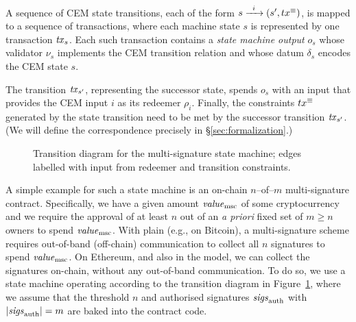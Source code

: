 A sequence of CEM state transitions, each of the form $ s \xrightarrow{\hspace{5pt} i \hspace{5pt}} (s' , tx^\equiv) $, is mapped to a sequence of transactions, where each machine state $s$ is represented by one transaction $\mathit{tx}_s$. Each such transaction contains a \emph{state machine output} $o_s$ whose validator $\nu_s$ implements the CEM transition relation and whose datum $\delta_s$ encodes the CEM state $s$.

The transition $\mathit{tx}_{s'}$, representing the successor state, spends $o_s$ with an input that provides the CEM input $i$ as its redeemer $\rho_i$. Finally, the constraints $tx^\equiv$ generated by the state transition need to be met by the successor transition $\mathit{tx}_{s'}$. (We will define the correspondence precisely in \S\ref{sec:formalization}.)

\begin{figure}[t]
  \centering
  \caption{Transition diagram for the multi-signature state machine;
    edges labelled with input from redeemer and transition constraints.}
  \label{fig:multisig-machine}
\end{figure}

A simple example for such a state machine is an on-chain $n$--of--$m$ multi-signature contract. Specifically, we have a given amount
$\mathit{value}_{\mathrm{msc}}$ of some cryptocurrency and we require the approval of at
least $n$ out of an \textit{a priori} fixed set of $m \geq n$ owners to spend
$\mathit{value}_{\mathrm{msc}}$. With plain \UTXO{} (e.g., on Bitcoin), a multi-signature
scheme requires out-of-band (off-chain) communication to collect all
$n$ signatures to spend $\mathit{value}_{\mathrm{msc}}$. On Ethereum, and also in the
\EUTXO{} model, we can collect the signatures on-chain, without any
out-of-band communication. To do so, we use a state machine operating
according to the transition diagram in
Figure~\ref{fig:multisig-machine}, where we assume that the threshold
$n$ and authorised signatures $\mathit{sigs}_{\mathrm{auth}}$ with \(|\mathit{sigs}_{\mathrm{auth}}| = m\)
are baked into the contract code.

